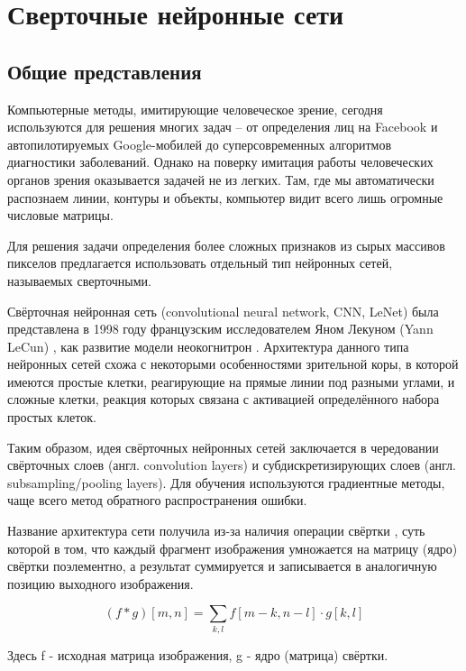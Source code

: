\documentclass[14pt]{article}
\numberwithin{figure}{section}
\numberwithin{equation}{section}
\begin{document}
\newpage

\section{Сверточные нейронные сети}

\subsection{Общие представления}

Компьютерные методы, имитирующие человеческое зрение, сегодня используются для решения многих задач – от определения лиц на Facebook и автопилотируемых Google-мобилей до суперсовременных алгоритмов диагностики заболеваний. Однако на поверку имитация работы человеческих органов зрения оказывается задачей не из легких. Там, где мы автоматически распознаем линии, контуры и объекты, компьютер видит всего лишь огромные числовые матрицы.

Для решения задачи определения более сложных признаков из сырых массивов пикселов предлагается использовать отдельный тип нейронных сетей, называемых сверточными.

Свёрточная нейронная сеть (convolutional neural network, CNN, LeNet) была представлена в 1998 году французским исследователем Яном Лекуном (Yann LeCun) \cite{LeCun}, как развитие модели неокогнитрон \cite{Fukushima}. Архитектура данного типа нейронных сетей схожа с некоторыми особенностями зрительной коры, в которой имеются простые клетки, реагирующие на прямые линии под разными углами, и сложные клетки, реакция которых связана с активацией определённого набора простых клеток.

Таким образом, идея свёрточных нейронных сетей заключается в чередовании свёрточных слоев (англ. convolution layers) и субдискретизирующих слоев (англ. subsampling/pooling layers). Для обучения используются градиентные методы, чаще всего метод обратного распространения ошибки.

Название архитектура сети получила из-за наличия операции свёртки \cite{Borisov1}, суть которой в том, что каждый фрагмент изображения умножается на матрицу (ядро) свёртки поэлементно, а результат суммируется и записывается в аналогичную позицию выходного изображения.

\begin{equation}
	(f * g)[m, n] = \sum_{k,l}{f[m - k, n - l] \cdot g[k, l]}
\end{equation}

Здесь f - исходная матрица изображения, g - ядро (матрица) свёртки.
\end{document}
